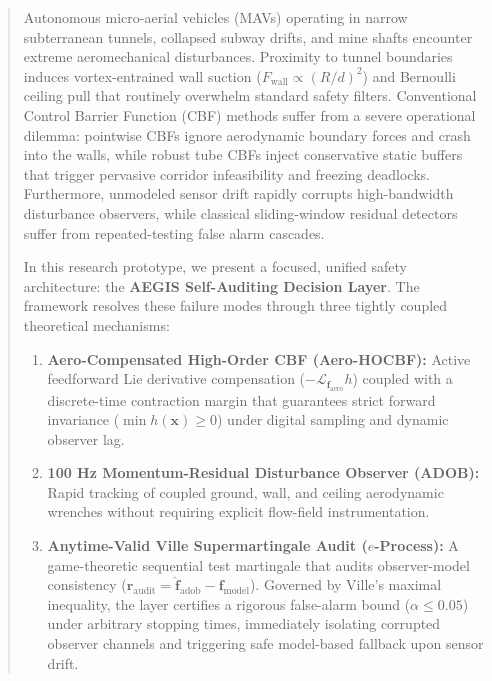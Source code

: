 \documentclass[11pt,a4paper]{article}
\begin{document}
\begin{abstract}
\noindent Autonomous micro-aerial vehicles (MAVs) operating in narrow subterranean tunnels, collapsed subway drifts, and mine shafts encounter extreme aeromechanical disturbances. Proximity to tunnel boundaries induces vortex-entrained wall suction ($F_{\text{wall}} \propto (R/d)^2$) and Bernoulli ceiling pull that routinely overwhelm standard safety filters. Conventional Control Barrier Function (CBF) methods suffer from a severe operational dilemma: pointwise CBFs ignore aerodynamic boundary forces and crash into the walls, while robust tube CBFs inject conservative static buffers that trigger pervasive corridor infeasibility and freezing deadlocks. Furthermore, unmodeled sensor drift rapidly corrupts high-bandwidth disturbance observers, while classical sliding-window residual detectors suffer from repeated-testing false alarm cascades.

\medskip
\noindent In this research prototype, we present a focused, unified safety architecture: the \textbf{AEGIS Self-Auditing Decision Layer}. The framework resolves these failure modes through three tightly coupled theoretical mechanisms:
\begin{enumerate}[leftmargin=18pt, itemsep=2pt]
    \item \textbf{Aero-Compensated High-Order CBF (Aero-HOCBF):} Active feedforward Lie derivative compensation ($-\mathcal{L}_{\mathbf{f}_{\text{aero}}} h$) coupled with a discrete-time contraction margin that guarantees strict forward invariance ($\min h(\mathbf{x}) \ge 0$) under digital sampling and dynamic observer lag.
    \item \textbf{100 Hz Momentum-Residual Disturbance Observer (ADOB):} Rapid tracking of coupled ground, wall, and ceiling aerodynamic wrenches without requiring explicit flow-field instrumentation.
    \item \textbf{Anytime-Valid Ville Supermartingale Audit ($e$-Process):} A game-theoretic sequential test martingale that audits observer-model consistency ($\mathbf{r}_{\text{audit}} = \hat{\mathbf{f}}_{\text{adob}} - \mathbf{f}_{\text{model}}$). Governed by Ville's maximal inequality, the layer certifies a rigorous false-alarm bound ($\alpha \le 0.05$) under arbitrary stopping times, immediately isolating corrupted observer channels and triggering safe model-based fallback upon sensor drift.
\end{enumerate}


\end{abstract}
\end{document}
